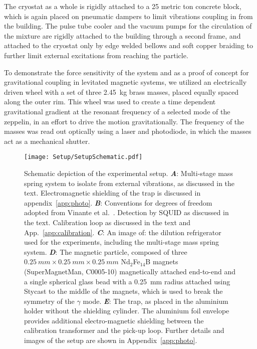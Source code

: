 The cryostat as a whole is rigidly attached to a 25 metric ton concrete block, which is again placed on pneumatic dampers to limit vibrations coupling in from the building. The pulse tube cooler and the vacuum pumps for the circulation of the mixture are rigidly attached to the building through a second frame, and attached to the cryostat only by edge welded bellows and soft copper braiding to further limit external excitations from reaching the particle.

To demonstrate the force sensitivity of the system and as a proof of concept for gravitational coupling in levitated magnetic systems, we utilized an electrically driven wheel with a set of three \SI{2.45}{kg} brass masses, placed equally spaced along the outer rim.
This wheel was used to create a time dependent gravitational gradient at the resonant frequency of a selected mode of the zeppelin, in an effort to drive the motion gravitationally.
The frequency of the masses was read out optically using a laser and photodiode, in which the masses act as a mechanical shutter.

\begin{figure}[ht]
    \centering
    \texttt{[image: Setup/SetupSchematic.pdf]}%
    \caption{Schematic depiction of the experimental setup. \textbf{\emph{A}}: Multi-stage mass spring system to isolate from external vibrations, as discussed in the text. Electromagnetic shielding of the trap is discussed in appendix~\ref{app:photo}.
    \textbf{\emph{B}}: Conventions for degrees of freedom adopted from Vinante et al.~\cite{vinante2020}. Detection by SQUID as discussed in the text.  Calibration loop as discussed in the text and App.~\ref{app:calibration}. 
    \textbf{\emph{C}}: An image of: the dilution refrigerator used for the experiments, including the multi-stage mass spring system. 
    \textbf{\emph{D}}: The magnetic particle, composed of three $\SI{0.25}{mm} \times \SI{0.25}{mm} \times \SI{0.25}{mm}$ Nd$_{2}$Fe$_{14}$B magnets (SuperMagnetMan, C0005-10) magnetically attached end-to-end and a single spherical glass bead with a \SI{0.25}{mm} radius attached using Stycast to the middle of the magnets, which is used to break the symmetry of the $\gamma$ mode.
    \textbf{\emph{E}}: The trap, as placed in the aluminium holder without the shielding cylinder. The aluminium foil envelope provides additional electro-magnetic shielding between the calibration transformer and the pick-up loop.
    Further details and images of the setup are shown in Appendix~\ref{app:photo}.
    }\label{fig1:setup}
\end{figure}